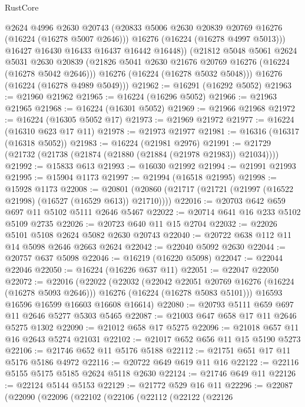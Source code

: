 \begin{lexlean}{RustCore}
\begin{coremodule}
            @2624
            @4996
            @2630
            @20743
            (@20833 @5006 @2630 @20839 @20769 @16276 (@16224 (@16278 @5007 @2646)))
            @16276
            (@16224 (@16278 @4997 @5013)))
          @16427
          @16430
          @16433
          @16437
          @16442
          @16448))
      (@21812
        @5048
        @5061
        @2624
        @5031
        @2630
        @20839
        (@21826 @5041 @2630 @21676 @20769 @16276 (@16224 (@16278 @5042 @2646)))
        @16276
        (@16224 (@16278 @5032 @5048)))
      @16276
      (@16224 (@16278 @4989 @5049)))
@21962 := @16291 (@16292 @5052)
@21963 := @21960 @21962
@21965 := @16224 (@16296 @5052)
@21966 := @21963 @21965
@21968 := @16224 (@16301 @5052)
@21969 := @21966 @21968
@21972 := @16224 (@16305 @5052 @17)
@21973 := @21969 @21972
@21977 := @16224 (@16310 @623 @17 @11)
@21978 := @21973 @21977
@21981 := @16316 (@16317 (@16318 @5052))
@21983 := @16224 (@21981 @2976)
@21991 := @21729 (@21732 (@21738 (@21874 (@21880 (@21884 (@21978 @21983)) @21034))))
@21992 := @15833 @613
@21993 := @16030 @21992
@21994 := @21991 @21993
@21995 := @15904 @1173
@21997 := @21994 (@16518 @21995)
@21998 := @15928 @1173
@22008 := @20801 (@20860 (@21717 (@21721 (@21997 (@16522 @21998) (@16527 (@16529 @613)) @21710))))
@22016 := @20703 @642 @659 @697 @11 @5102 @5111 @2646 @5467
@22022 := @20714 @641 @16 @233 @5102 @5109 @2735
@22026 := @20723 @640 @11 @15 @2704
@22032 := @22026 @5101 @5108 @2624 @5082 @2630 @20743
@22040 := @20722 @638 @112 @11 @14 @5098 @2646 @2663 @2624
@22042 := @22040 @5092 @2630
@22044 := @20757 @637 @5098
@22046 := @16219 (@16220 @5098)
@22047 := @22044 @22046
@22050 := @16224 (@16226 @637 @11)
@22051 := @22047 @22050
@22072 := @22016
    (@22022
      (@22032
        (@22042 @22051 @20769 @16276 (@16224 (@16278 @5093 @2646)))
        @16276
        (@16224 (@16278 @5083 @5101)))
      @16593
      @16596
      @16599
      @16603
      @16608
      @16614)
@22080 := @20793 @5111 @659 @697 @11 @2646 @5277 @5303 @5465
@22087 := @21003 @647 @658 @17 @11 @2646 @5275 @1302
@22090 := @21012 @658 @17 @5275
@22096 := @21018 @657 @11 @16 @2643 @5274 @21031
@22102 := @21017 @652 @656 @11 @15 @5190 @5273
@22106 := @21746 @652 @11 @5176 @5188
@22112 := @21751 @651 @17 @11 @5176 @5186 @4972
@22116 := @20722 @649 @619 @11 @16
@22122 := @22116 @5155 @5175 @5185 @2624 @5118 @2630
@22124 := @21746 @649 @11
@22126 := @22124 @5144 @5153
@22129 := @21772 @529 @16 @11
@22296 := @22087
    (@22090
      (@22096
        (@22102
          (@22106
            (@22112
              (@22122
                (@22126

\end{coremodule}
\end{lexlean}
